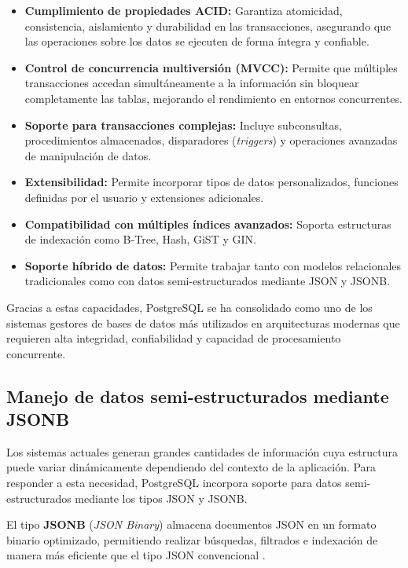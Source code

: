 \begin{itemize}

\item \textbf{Cumplimiento de propiedades ACID:} Garantiza atomicidad, consistencia, aislamiento y durabilidad en las transacciones, asegurando que las operaciones sobre los datos se ejecuten de forma íntegra y confiable.

\item \textbf{Control de concurrencia multiversión (MVCC):} Permite que múltiples transacciones accedan simultáneamente a la información sin bloquear completamente las tablas, mejorando el rendimiento en entornos concurrentes.

\item \textbf{Soporte para transacciones complejas:} Incluye subconsultas, procedimientos almacenados, disparadores (\textit{triggers}) y operaciones avanzadas de manipulación de datos.

\item \textbf{Extensibilidad:} Permite incorporar tipos de datos personalizados, funciones definidas por el usuario y extensiones adicionales.

\item \textbf{Compatibilidad con múltiples índices avanzados:} Soporta estructuras de indexación como B-Tree, Hash, GiST y GIN.

\item \textbf{Soporte híbrido de datos:} Permite trabajar tanto con modelos relacionales tradicionales como con datos semi-estructurados mediante JSON y JSONB.
\end{itemize}

Gracias a estas capacidades, PostgreSQL se ha consolidado como uno de los sistemas gestores de bases de datos más utilizados en arquitecturas modernas que requieren alta integridad, confiabilidad y capacidad de procesamiento concurrente.

\subsection{Manejo de datos semi-estructurados mediante JSONB}

Los sistemas actuales generan grandes cantidades de información cuya estructura puede variar dinámicamente dependiendo del contexto de la aplicación. Para responder a esta necesidad, PostgreSQL incorpora soporte para datos semi-estructurados mediante los tipos JSON y JSONB.

El tipo \textbf{JSONB} (\textit{JSON Binary}) almacena documentos JSON en un formato binario optimizado, permitiendo realizar búsquedas, filtrados e indexación de manera más eficiente que el tipo JSON convencional \cite{60}.

